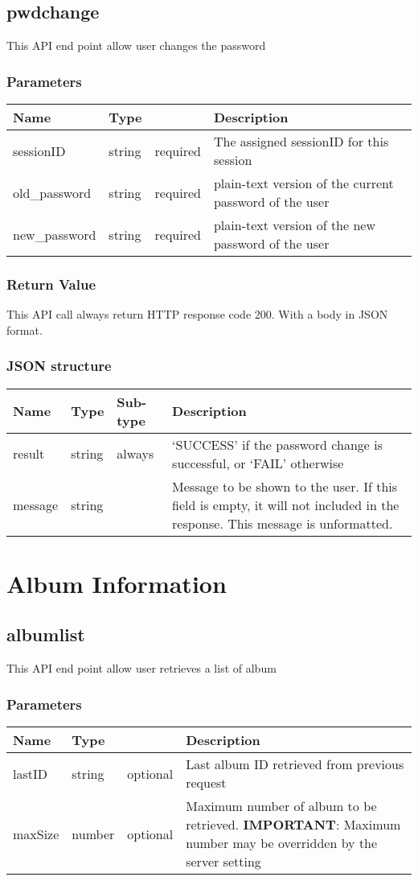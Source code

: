 \documentclass[a4paper,12pt]{report}
\begin{document}
	\section{pwdchange}
	This API end point allow user changes the password
	\subsection{Parameters}
	\begin{tabular}{|l|ll|p{10cm}|}
		\hline
		Name & Type & & Description\\\hline
		sessionID & string & required & The assigned sessionID for this session\\\hline
		old\_password & string & required & plain-text version of the current password of the user\\\hline
		new\_password & string & required & plain-text version of the new password of the user\\\hline
	\end{tabular}
	\subsection{Return Value}
	This API call always return HTTP response code 200. With a body in JSON format.
	\subsection{JSON structure}
	\begin{tabular}{|l|l|l|p{10cm}|}
		\hline
		Name & Type & Sub-type & Description\\\hline
		result & string & always & 	`SUCCESS' if the password change is successful, or\newline
		`FAIL' otherwise\\\hline
		message & string & & Message to be shown to the user. If this field is empty, it will not included in the response. This message is unformatted.\\\hline
	\end{tabular}
	\chapter{Album Information}
	
	\section{albumlist}
	This API end point allow user retrieves a list of album
	\subsection{Parameters}
	\begin{tabular}{|l|ll|p{10cm}|}
		\hline
		Name & Type & & Description\\\hline
		lastID & string & optional & Last album ID retrieved from previous request\\\hline
		maxSize & number & optional & Maximum number of album to be retrieved.\newline
		\textbf{IMPORTANT}: Maximum number may be overridden by the server setting \\\hline
	\end{tabular}
\end{document}
